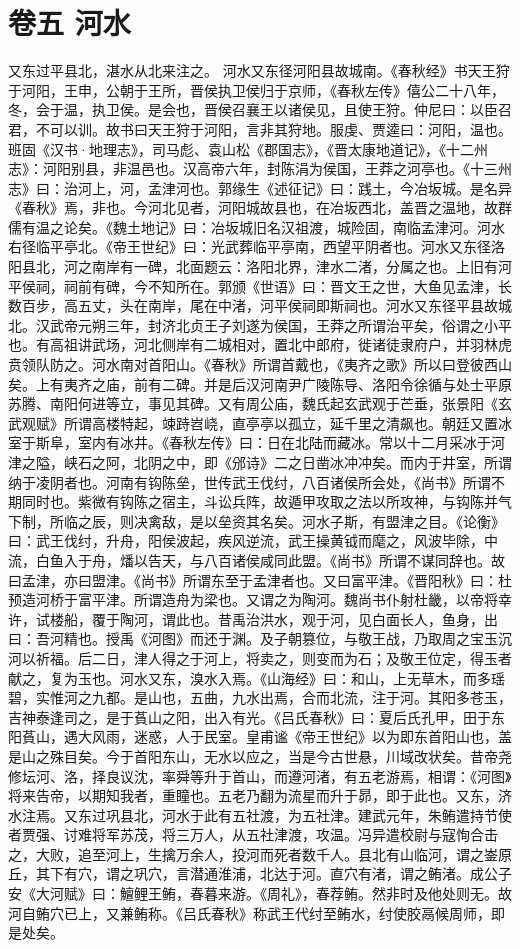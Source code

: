 \documentclass[12pt,UTF8]{ctexbook}
\begin{document}
\chapter{卷五 河水 }
又东过平县北，湛水从北来注之。
河水又东径河阳县故城南。《春秋经》书天王狩于河阳，王申，公朝于王所，晋侯执卫侯归于京师，《春秋左传》僖公二十八年，冬，会于温，执卫侯。是会也，晋侯召襄王以诸侯见，且使王狩。仲尼曰：以臣召君，不可以训。故书曰天王狩于河阳，言非其狩地。服虔、贾逵曰：河阳，温也。班固《汉书·地理志》，司马彪、袁山松《郡国志》，《晋太康地道记》，《十二州志》：河阳别县，非温邑也。汉高帝六年，封陈涓为侯国，王莽之河亭也。《十三州志》曰：治河上，河，孟津河也。郭缘生《述征记》曰：践土，今冶坂城。是名异《春秋》焉，非也。今河北见者，河阳城故县也，在冶坂西北，盖晋之温地，故群儒有温之论矣。《魏土地记》曰：冶坂城旧名汉祖渡，城险固，南临孟津河。河水右径临平亭北。《帝王世纪》曰：光武葬临平亭南，西望平阴者也。河水又东径洛阳县北，河之南岸有一碑，北面题云：洛阳北界，津水二渚，分属之也。上旧有河平侯祠，祠前有碑，今不知所在。郭颁《世语》曰：晋文王之世，大鱼见孟津，长数百步，高五丈，头在南岸，尾在中渚，河平侯祠即斯祠也。河水又东径平县故城北。汉武帝元朔三年，封济北贞王子刘遂为侯国，王莽之所谓治平矣，俗谓之小平也。有高祖讲武场，河北侧岸有二城相对，置北中郎府，徙诸徒隶府户，并羽林虎贲领队防之。河水南对首阳山。《春秋》所谓首戴也，《夷齐之歌》所以曰登彼西山矣。上有夷齐之庙，前有二碑。并是后汉河南尹广陵陈导、洛阳令徐循与处士平原苏腾、南阳何进等立，事见其碑。又有周公庙，魏氏起玄武观于芒垂，张景阳《玄武观赋》所谓高楼特起，竦跱岧峣，直亭亭以孤立，延千里之清飙也。朝廷又置冰室于斯阜，室内有冰井。《春秋左传》曰：日在北陆而藏冰。常以十二月采冰于河津之隘，峡石之阿，北阴之中，即《邠诗》二之日凿冰冲冲矣。而内于井室，所谓纳于凌阴者也。河南有钩陈垒，世传武王伐纣，八百诸侯所会处，《尚书》所谓不期同时也。紫微有钩陈之宿主，斗讼兵阵，故遁甲攻取之法以所攻神，与钩陈并气下制，所临之辰，则决禽敌，是以垒资其名矣。河水子斯，有盟津之目。《论衡》曰：武王伐纣，升舟，阳侯波起，疾风逆流，武王操黄钺而麾之，风波毕除，中流，白鱼入于舟，燔以告天，与八百诸侯咸同此盟。《尚书》所谓不谋同辞也。故曰孟津，亦曰盟津。《尚书》所谓东至于孟津者也。又曰富平津。《晋阳秋》曰：杜预造河桥于富平津。所谓造舟为梁也。又谓之为陶河。魏尚书仆射杜畿，以帝将幸许，试楼船，覆于陶河，谓此也。昔禹治洪水，观于河，见白面长人，鱼身，出曰：吾河精也。授禹《河图》而还于渊。及子朝篡位，与敬王战，乃取周之宝玉沉河以祈福。后二日，津人得之于河上，将卖之，则变而为石；及敬王位定，得玉者献之，复为玉也。河水又东，溴水入焉。《山海经》曰：和山，上无草木，而多瑶碧，实惟河之九都。是山也，五曲，九水出焉，合而北流，注于河。其阳多苍玉，吉神泰逢司之，是于萯山之阳，出入有光。《吕氏春秋》曰：夏后氏孔甲，田于东阳萯山，遇大风雨，迷惑，人于民室。皇甫谧《帝王世纪》以为即东首阳山也，盖是山之殊目矣。今于首阳东山，无水以应之，当是今古世悬，川域改状矣。昔帝尧修坛河、洛，择良议沈，率舜等升于首山，而遵河渚，有五老游焉，相谓：《河图》将来告帝，以期知我者，重瞳也。五老乃翻为流星而升于昴，即于此也。又东，济水注焉。又东过巩县北，河水于此有五社渡，为五社津。建武元年，朱鲔遣持节使者贾强、讨难将军苏茂，将三万人，从五社津渡，攻温。冯异遣校尉与寇恂合击之，大败，追至河上，生擒万余人，投河而死者数千人。县北有山临河，谓之崟原丘，其下有穴，谓之巩穴，言潜通淮浦，北达于河。直穴有渚，谓之鲔渚。成公子安《大河赋》曰：鱣鲤王鲔，春暮来游。《周礼》，春荐鲔。然非时及他处则无。故河自鲔穴已上，又兼鲔称。《吕氏春秋》称武王代纣至鲔水，纣使胶鬲候周师，即是处矣。
\end{document}
